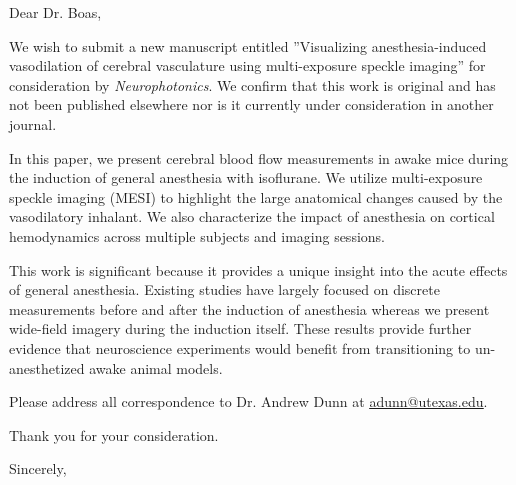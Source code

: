 \documentclass[12pt]{letter}
\begin{document}
\begin{letter}{}

\opening{Dear Dr. Boas,}

We wish to submit a new manuscript entitled ''Visualizing anesthesia-induced vasodilation of cerebral vasculature using multi-exposure speckle imaging'' for consideration by \emph{Neurophotonics}. We confirm that this work is original and has not been published elsewhere nor is it currently under consideration in another journal.

In this paper, we present cerebral blood flow measurements in awake mice during the induction of general anesthesia with isoflurane. We utilize multi-exposure speckle imaging (MESI) to highlight the large anatomical changes caused by the vasodilatory inhalant. We also characterize the impact of anesthesia on cortical hemodynamics across multiple subjects and imaging sessions.

This work is significant because it provides a unique insight into the acute effects of general anesthesia. Existing studies have largely focused on discrete measurements before and after the induction of anesthesia whereas we present wide-field imagery during the induction itself. These results provide further evidence that neuroscience experiments would benefit from transitioning to un-anesthetized awake animal models.

Please address all correspondence to Dr. Andrew Dunn at \href{mailto:adunn@utexas.edu}{\underline{adunn@utexas.edu}}.

Thank you for your consideration.

\closing{Sincerely,}

\end{letter}
\end{document}
